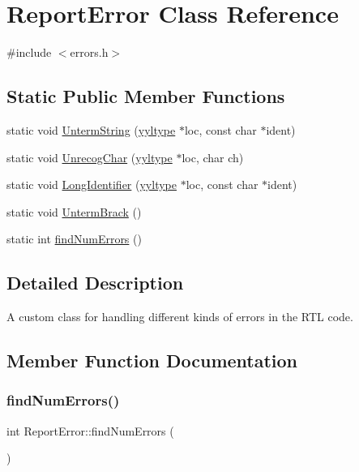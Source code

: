 \hypertarget{class_report_error}{}\section{Report\+Error Class Reference}
\label{class_report_error}


{\ttfamily \#include $<$errors.\+h$>$}

\subsection*{Static Public Member Functions}
\begin{DoxyCompactItemize}
\item 
static void \hyperlink{class_report_error_afcea6674af39a926a615b9318db590e3}{Unterm\+String} (\hyperlink{structyyltype}{yyltype} $\ast$loc, const char $\ast$ident)
\item 
static void \hyperlink{class_report_error_a8c066b4ee6cd5e854099af3bdaedad39}{Unrecog\+Char} (\hyperlink{structyyltype}{yyltype} $\ast$loc, char ch)
\item 
static void \hyperlink{class_report_error_af21c5aee5a4009e032599b34a1066bfc}{Long\+Identifier} (\hyperlink{structyyltype}{yyltype} $\ast$loc, const char $\ast$ident)
\item 
static void \hyperlink{class_report_error_a25e0847a7068c5543494a2e0fc6da6eb}{Unterm\+Brack} ()
\item 
static int \hyperlink{class_report_error_a2b36be5bf0fb43372cd2e9d6ef52262b}{find\+Num\+Errors} ()
\end{DoxyCompactItemize}


\subsection{Detailed Description}
A custom class for handling different kinds of errors in the R\+TL code. 

\subsection{Member Function Documentation}
\mbox{\label{class_report_error_a2b36be5bf0fb43372cd2e9d6ef52262b}} 
\subsubsection{\texorpdfstring{find\+Num\+Errors()}{findNumErrors()}}
{\footnotesize\ttfamily int Report\+Error\+::find\+Num\+Errors (\begin{DoxyParamCaption}{ }\end{DoxyParamCaption})\hspace{0.3cm}{\ttfamily [static]}}

